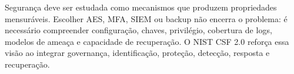 \begin{resumo}
Segurança deve ser estudada como mecanismos que produzem propriedades mensuráveis. Escolher AES, MFA, SIEM ou backup não encerra o problema: é necessário compreender configuração, chaves, privilégio, cobertura de logs, modelos de ameaça e capacidade de recuperação. O NIST CSF 2.0 reforça essa visão ao integrar governança, identificação, proteção, detecção, resposta e recuperação.
\end{resumo}
